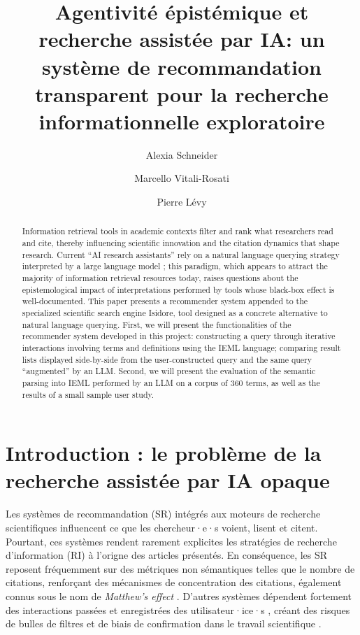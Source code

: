 \documentclass[final,fra]{anthology-ch} %
\title{Agentivité épistémique et recherche assistée par IA: un système
de recommandation transparent pour la recherche informationnelle
exploratoire}
\author[1]{Alexia Schneider}[
  orcid=0009-0000-0651-9792,
  email=alexia.schneider@umontreal.ca
]
\author[1]{Marcello Vitali-Rosati}[
  orcid=0000-0001-6424-3229,
  email=marcello.vitali.rosati@umontreal.ca
]
\author[1]{Pierre Lévy}[
  orcid=0000-0003-1599-221X,
  email=
]
\affiliation{1}{Université de Montréal}
\begin{document}
\maketitle

\begin{abstract}
Information retrieval tools in academic contexts filter and rank what
researchers read and cite, thereby influencing scientific innovation and
the citation dynamics that shape research. Current ``AI research
assistants'' rely on a natural language querying strategy interpreted by
a large language model ; this paradigm, which appears to attract the
majority of information retrieval resources today, raises questions
about the epistemological impact of interpretations performed by tools
whose black-box effect is well-documented. This paper presents a
recommender system appended to the specialized scientific search engine
Isidore, tool designed as a concrete alternative to natural language
querying. First, we will present the functionalities of the recommender
system developed in this project: constructing a query through iterative
interactions involving terms and definitions using the IEML language;
comparing result lists displayed side-by-side from the user-constructed
query and the same query ``augmented'' by an LLM. Second, we will
present the evaluation of the semantic parsing into IEML performed by an
LLM on a corpus of 360 terms, as well as the results of a small sample
user study.
\end{abstract}

\vspace{1cm}
\section{Introduction : le problème de la recherche assistée par IA opaque}\label{introduction-le-probluxe8me-de-la-recherche-assistuxe9e-par-ia-opaque}

Les systèmes de recommandation (SR) intégrés aux moteurs de recherche
scientifiques influencent ce que les chercheur·e·s voient, lisent et
citent. Pourtant, ces systèmes rendent rarement explicites les
stratégies de recherche d'information (RI) à l'origne des articles
présentés. En conséquence, les SR reposent fréquemment sur des métriques
non sémantiques telles que le nombre de citations, renforçant des
mécanismes de concentration des citations, également connus sous le nom
de \emph{Matthew's effect} \autocite{mertonMatthewEffectScience1968}.
D'autres systèmes dépendent fortement des interactions passées et
enregistrées des utilisateur·ice·s
\autocite{kosterSerendipitousRecommendationBased2014}, créant des
risques de bulles de filtres \autocite{pariserFilterBubble2012} et
de biais de confirmation dans le travail scientifique
\autocite{underwoodTheorizingResearchPractices2014}.
\end{document}
